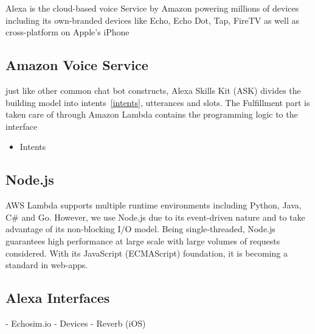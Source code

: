 Alexa is the cloud-based voice Service by Amazon powering millions of devices  including its own-branded devices like Echo, Echo Dot, Tap, FireTV as well as cross-platform on Apple's iPhone
\subsection{Amazon Voice Service}
just like other common chat bot constructs, Alexa Skills Kit (ASK) divides the building model into intents~\ref{intents}, utterances and slots. The Fulfillment part is taken care of through Amazon Lambda contains the programming  logic to the interface
\begin{itemize}
	\item Intents
	\
\end{itemize}

\subsection{Node.js}

AWS Lambda supports multiple runtime environments including Python, Java, C\# and Go. However, we use Node.js due to its event-driven nature and to take advantage of its non-blocking I/O model. Being single-threaded, Node.js guarantees high performance at large scale with large volumes of requests considered. With its JavaScript (ECMAScript) foundation, it is becoming a standard in web-apps. 

\subsection{Alexa Interfaces}
- Echosim.io
- Devices
- Reverb (iOS)

